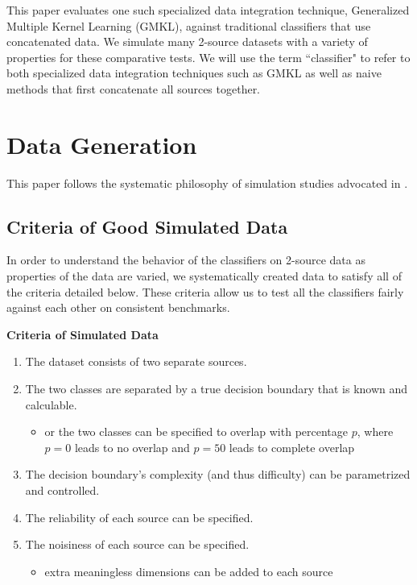 \documentclass{article}
\begin{document}
This paper evaluates one such specialized data integration technique,
Generalized Multiple Kernel Learning (GMKL), against traditional classifiers
that use concatenated data. We simulate many 2-source datasets with a variety
of properties for these comparative tests. We will use the term ``classifier"
to refer to both specialized data integration techniques such as GMKL as well
as naive methods that first concatenate all sources together.












\section*{Data Generation}

This paper follows the systematic philosophy of simulation studies advocated in
\cite{neto2014simulation}.


\subsection*{Criteria of Good Simulated Data}

In order to understand the behavior of the classifiers on 2-source data as
properties of the data are varied, we systematically created data to satisfy
all of the criteria detailed below. These criteria allow us to test all
the classifiers fairly against each other on consistent benchmarks.
\newline

\begin{minipage}{\textwidth}
\centering
\textbf{Criteria of Simulated Data}
\begin{enumerate}
    \item The dataset consists of two separate sources.
    \item \label{itm:separable} The two classes are separated by a true
        decision boundary that is known and calculable.
    \begin{itemize}
        \item or the two classes can be specified to overlap with percentage
            $p$, where $p=0$ leads to no overlap and $p=50$ leads to complete
            overlap
    \end{itemize}
    \item The decision boundary's complexity (and thus difficulty) can be
        parametrized and controlled.
    \item The reliability of each source can be specified.
    \item The noisiness of each source can be specified.
    \begin{itemize}
        \item \label{itm:noisy} extra meaningless dimensions can be
            added to each source
    \end{itemize}
\end{enumerate}
\label{tab:criteria}
\end{minipage}
\end{document}
